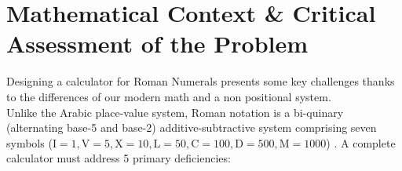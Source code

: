 \documentclass[11pt, a4paper]{article}
\begin{document}
\setcounter{page}{1}




\section{Mathematical Context \& Critical Assessment of the Problem}

Designing a calculator for Roman Numerals presents some key challenges thanks to the differences of our modern math and a non positional system. \\
Unlike the Arabic place-value system, Roman notation is a bi-quinary (alternating base-5 and base-2) additive-subtractive system comprising seven symbols ($\text{I}=1, \text{V}=5, \text{X}=10, \text{L}=50, \text{C}=100, \text{D}=500, \text{M}=1000$) \cite{lewis2019}. A complete calculator must address 5 primary deficiencies: \cite{geeksforgeeks2021, steins2022}
\end{document}
